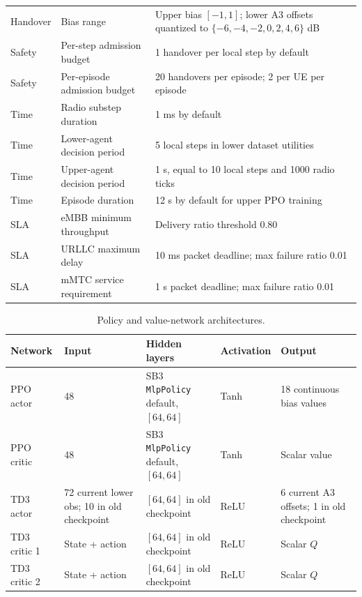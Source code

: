 \begin{table}[htbp]
\begin{tabular}{lll}
Handover & Bias range & Upper bias $[-1,1]$; lower A3 offsets quantized to $\{-6,-4,-2,0,2,4,6\}$ dB \\
Safety & Per-step admission budget & 1 handover per local step by default \\
Safety & Per-episode admission budget & 20 handovers per episode; 2 per UE per episode \\
Time & Radio substep duration & 1 ms by default \\
Time & Lower-agent decision period & 5 local steps in lower dataset utilities \\
Time & Upper-agent decision period & 1 s, equal to 10 local steps and 1000 radio ticks \\
Time & Episode duration & 12 s by default for upper PPO training \\
SLA & eMBB minimum throughput & Delivery ratio threshold 0.80 \\
SLA & URLLC maximum delay & 10 ms packet deadline; max failure ratio 0.01 \\
SLA & mMTC service requirement & 1 s packet deadline; max failure ratio 0.01 \\
\bottomrule
\end{tabular}
\end{table}

\begin{table}[htbp]
\centering
\caption{Policy and value-network architectures.}
\label{tab:policy_value_network_architectures}
\begin{tabular}{lllll}
\toprule
\textbf{Network} & \textbf{Input} & \textbf{Hidden layers} & \textbf{Activation} & \textbf{Output} \\
\midrule
PPO actor & 48 & SB3 \texttt{MlpPolicy} default, $[64,64]$ & Tanh & 18 continuous bias values \\
PPO critic & 48 & SB3 \texttt{MlpPolicy} default, $[64,64]$ & Tanh & Scalar value \\
TD3 actor & 72 current lower obs; 10 in old checkpoint & $[64,64]$ in old checkpoint & ReLU & 6 current A3 offsets; 1 in old checkpoint \\
TD3 critic 1 & State + action & $[64,64]$ in old checkpoint & ReLU & Scalar $Q$ \\
TD3 critic 2 & State + action & $[64,64]$ in old checkpoint & ReLU & Scalar $Q$ \\
\bottomrule
\end{tabular}
\end{table}

